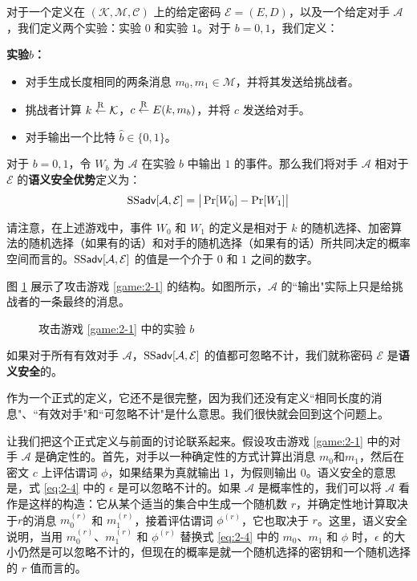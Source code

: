 \begin{game}[语义安全性]\label{game:2-1}
对于一个定义在 $(\mathcal{K},\mathcal{M},\mathcal{C})$ 上的给定密码 $\mathcal{E}=(E,D)$，以及一个给定对手 $\mathcal{A}$，我们定义两个实验：实验 $0$ 和实验 $1$。对于 $b=0,1$，我们定义：

\noindent\textbf{实验$b$：}
\begin{itemize}
	\item 对手生成长度相同的两条消息 $m_0,m_1\in\mathcal{M}$，并将其发送给挑战者。
	\item 挑战者计算 $k\overset{\rm R}\leftarrow\mathcal{K}$，$c\overset{\rm R}\leftarrow E(k,m_b)$，并将 $c$ 发送给对手。
	\item 对手输出一个比特 $\hat b\in\{0,1\}$。
\end{itemize}

对于 $b=0,1$，令 $W_b$ 为 $\mathcal{A}$ 在实验 $b$ 中输出 $1$ 的事件。那么我们将对手 $\mathcal{A}$ 相对于 $\mathcal{E}$ 的\textbf{语义安全优势}定义为：
\[
{\rm SS\mathsf{adv}}[\mathcal{A},\mathcal{E}]=
\big\lvert
\Pr[W_0] -\Pr[W_1]
\big\rvert
\]
\end{game}

请注意，在上述游戏中，事件 $W_0$ 和 $W_1$ 的定义是相对于 $k$ 的随机选择、加密算法的随机选择（如果有的话）和对手的随机选择（如果有的话）所共同决定的概率空间而言的。${\rm SS\mathsf{adv}}[\mathcal{A},\mathcal{E}]$ 的值是一个介于 $0$ 和 $1$ 之间的数字。

图 \ref{fig:2-1} 展示了攻击游戏 \ref{game:2-1} 的结构。如图所示，$\mathcal{A}$ 的``输出"实际上只是给挑战者的一条最终的消息。

\begin{figure}
	\centering
	
	\caption{攻击游戏 \ref{game:2-1} 中的实验 $b$}
	\label{fig:2-1}
\end{figure}

\begin{definition}[语义安全性]\label{def:2-2}
如果对于所有有效对手 $\mathcal{A}$，${\rm SS\mathsf{adv}}[\mathcal{A},\mathcal{E}]$ 的值都可忽略不计，我们就称密码 $\mathcal{E}$ 是\textbf{语义安全}的。
\end{definition}

作为一个正式的定义，它还不是很完整，因为我们还没有定义``相同长度的消息"、``有效对手"和``可忽略不计"是什么意思。我们很快就会回到这个问题上。

让我们把这个正式定义与前面的讨论联系起来。假设攻击游戏 \ref{game:2-1} 中的对手 $\mathcal{A}$ 是确定性的。首先，对手以一种确定性的方式计算出消息 $m_0$和$m_1$，然后在密文 $c$ 上评估谓词 $\phi$，如果结果为真就输出 $1$，为假则输出 $0$。语义安全的意思是，式 \ref{eq:2-4} 中的 $\epsilon$ 是可以忽略不计的。如果 $\mathcal{A}$ 是概率性的，我们可以将 $\mathcal{A}$ 看作是这样的构造：它从某个适当的集合中生成一个随机数 $r$，并确定性地计算取决于$r$的消息 $m^{(r)}_0$ 和 $m^{(r)}_1$，接着评估谓词 $\phi^{(r)}$，它也取决于 $r$。这里，语义安全说明，当用 $m^{(r)}_0$、$m^{(r)}_1$ 和 $\phi^{(r)}$ 替换式 \ref{eq:2-4} 中的 $m_0$、$m_1$ 和 $\phi$ 时，$\epsilon$ 的大小仍然是可以忽略不计的，但现在的概率是就一个随机选择的密钥和一个随机选择的 $r$ 值而言的。

